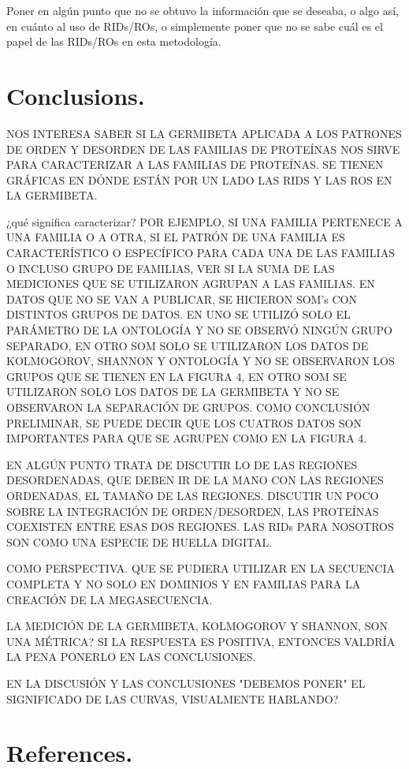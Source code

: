 \documentclass[preprint,12pt]{elsarticle}
\begin{document}
\par Poner en algún punto que no se obtuvo la información que se deseaba, o algo así, en cuánto al uso de RIDs/ROs, o simplemente poner que no se sabe cuál es el papel de las RIDs/ROs en esta metodología. 

\clearpage


\section{\textbf{Conclusions.}}
\label{S:1}
NOS INTERESA SABER SI LA GERMIBETA APLICADA A LOS PATRONES DE ORDEN Y DESORDEN DE LAS FAMILIAS DE PROTEÍNAS NOS SIRVE PARA CARACTERIZAR A LAS FAMILIAS DE PROTEÍNAS. SE TIENEN GRÁFICAS EN DÓNDE ESTÁN POR UN LADO LAS RIDS Y LAS ROS EN LA GERMIBETA. 

¿qué significa caracterizar? POR EJEMPLO, SI UNA FAMILIA PERTENECE A UNA FAMILIA O A OTRA, SI EL PATRÓN DE UNA FAMILIA ES CARACTERÍSTICO O ESPECÍFICO PARA CADA UNA DE LAS FAMILIAS O INCLUSO GRUPO DE FAMILIAS, VER SI LA SUMA DE LAS MEDICIONES QUE SE UTILIZARON AGRUPAN A LAS FAMILIAS.
EN DATOS QUE NO SE VAN A PUBLICAR, SE HICIERON SOM's CON DISTINTOS GRUPOS DE DATOS. EN UNO SE UTILIZÓ SOLO EL PARÁMETRO DE LA ONTOLOGÍA Y NO SE OBSERVÓ NINGÚN GRUPO SEPARADO, EN OTRO SOM SOLO SE UTILIZARON LOS DATOS DE KOLMOGOROV, SHANNON Y ONTOLOGÍA Y NO SE OBSERVARON LOS GRUPOS QUE SE TIENEN EN LA FIGURA 4, EN OTRO SOM SE UTILIZARON SOLO LOS DATOS DE LA GERMIBETA Y NO SE OBSERVARON LA SEPARACIÓN DE GRUPOS. COMO CONCLUSIÓN PRELIMINAR, SE PUEDE DECIR QUE LOS CUATROS DATOS SON IMPORTANTES PARA QUE SE AGRUPEN COMO EN LA FIGURA 4. 

EN ALGÚN PUNTO TRATA DE DISCUTIR LO DE LAS REGIONES DESORDENADAS, QUE DEBEN IR DE LA MANO CON LAS REGIONES ORDENADAS, EL TAMAÑO DE LAS REGIONES. DISCUTIR UN POCO SOBRE LA INTEGRACIÓN DE ORDEN/DESORDEN, LAS PROTEÍNAS COEXISTEN ENTRE ESAS DOS REGIONES. LAS RIDs PARA NOSOTROS SON COMO UNA ESPECIE DE HUELLA DIGITAL. 

COMO PERSPECTIVA. QUE SE PUDIERA UTILIZAR EN LA SECUENCIA COMPLETA Y NO SOLO EN DOMINIOS Y EN FAMILIAS PARA LA CREACIÓN DE LA MEGASECUENCIA. 

LA MEDICIÓN DE LA GERMIBETA, KOLMOGOROV Y SHANNON, SON UNA MÉTRICA? SI LA RESPUESTA ES POSITIVA, ENTONCES VALDRÍA LA PENA PONERLO EN LAS CONCLUSIONES. 

EN LA DISCUSIÓN Y LAS CONCLUSIONES "DEBEMOS PONER" EL SIGNIFICADO DE LAS CURVAS, VISUALMENTE HABLANDO?
\bigbreak


\section{\textbf{References.}}
\label{S:1}
\end{document}
